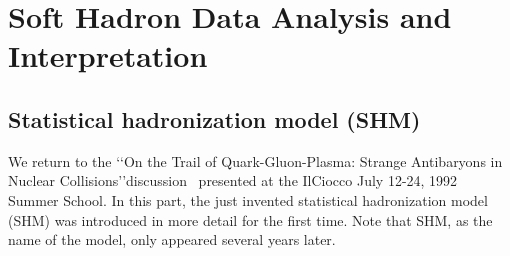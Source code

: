 \section{Soft Hadron Data Analysis and Interpretation}
%
\subsection{Statistical hadronization model (SHM)}
We return to the \lq\lq On the Trail of Quark-Gluon-Plasma: Strange Antibaryons in Nuclear Collisions\rq\rq discussion~\cite{Rafelski:1992td} presented at the IlCiocco July 12-24, 1992 Summer School. In this part, the just invented  statistical hadronization model~\cite{Rafelski:1991rh} (SHM) was introduced  in more detail for the first time. Note that SHM, as the name of the model, only appeared several years later.\\

